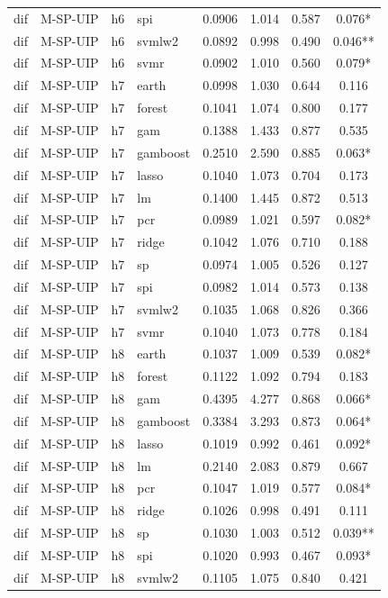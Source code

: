 \begin{ThreePartTable}
\begin{longtable}[t]{llclcccc}
dif & M-SP-UIP & h6 & spi & 0.0906 & 1.014 & 0.587 & 0.076*\\
dif & M-SP-UIP & h6 & svmlw2 & 0.0892 & 0.998 & 0.490 & 0.046**\\
dif & M-SP-UIP & h6 & svmr & 0.0902 & 1.010 & 0.560 & 0.079*\\
\addlinespace
dif & M-SP-UIP & h7 & earth & 0.0998 & 1.030 & 0.644 & 0.116\\
dif & M-SP-UIP & h7 & forest & 0.1041 & 1.074 & 0.800 & 0.177\\
dif & M-SP-UIP & h7 & gam & 0.1388 & 1.433 & 0.877 & 0.535\\
dif & M-SP-UIP & h7 & gamboost & 0.2510 & 2.590 & 0.885 & 0.063*\\
dif & M-SP-UIP & h7 & lasso & 0.1040 & 1.073 & 0.704 & 0.173\\
dif & M-SP-UIP & h7 & lm & 0.1400 & 1.445 & 0.872 & 0.513\\
dif & M-SP-UIP & h7 & pcr & 0.0989 & 1.021 & 0.597 & 0.082*\\
dif & M-SP-UIP & h7 & ridge & 0.1042 & 1.076 & 0.710 & 0.188\\
dif & M-SP-UIP & h7 & sp & 0.0974 & 1.005 & 0.526 & 0.127\\
dif & M-SP-UIP & h7 & spi & 0.0982 & 1.014 & 0.573 & 0.138\\
dif & M-SP-UIP & h7 & svmlw2 & 0.1035 & 1.068 & 0.826 & 0.366\\
dif & M-SP-UIP & h7 & svmr & 0.1040 & 1.073 & 0.778 & 0.184\\
\addlinespace
dif & M-SP-UIP & h8 & earth & 0.1037 & 1.009 & 0.539 & 0.082*\\
dif & M-SP-UIP & h8 & forest & 0.1122 & 1.092 & 0.794 & 0.183\\
dif & M-SP-UIP & h8 & gam & 0.4395 & 4.277 & 0.868 & 0.066*\\
dif & M-SP-UIP & h8 & gamboost & 0.3384 & 3.293 & 0.873 & 0.064*\\
dif & M-SP-UIP & h8 & lasso & 0.1019 & 0.992 & 0.461 & 0.092*\\
dif & M-SP-UIP & h8 & lm & 0.2140 & 2.083 & 0.879 & 0.667\\
dif & M-SP-UIP & h8 & pcr & 0.1047 & 1.019 & 0.577 & 0.084*\\
dif & M-SP-UIP & h8 & ridge & 0.1026 & 0.998 & 0.491 & 0.111\\
dif & M-SP-UIP & h8 & sp & 0.1030 & 1.003 & 0.512 & 0.039**\\
dif & M-SP-UIP & h8 & spi & 0.1020 & 0.993 & 0.467 & 0.093*\\
dif & M-SP-UIP & h8 & svmlw2 & 0.1105 & 1.075 & 0.840 & 0.421\\

\end{longtable}
\end{ThreePartTable}
